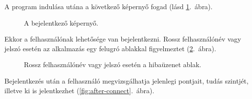 \documentclass[11pt, a4paper]{article}
\begin{document}
     A program indulása utána a következő képernyő fogad (lásd \ref{fig:connect}.~ábra).     
     \begin{figure}[h!]
	     \center
	     \caption{A bejelentkező képernyő.}
	     \label{fig:connect}
     \end{figure} 
     Ekkor a felhasználónak lehetősége van bejelentkezni. Rossz felhasználónév vagy jelszó esetén az alkalmazás egy felugró ablakkal figyelmeztet (\ref{fig:login-error}.~ábra).
     \begin{figure}[h!]
     	\center
     	\caption{Rossz felhasználónév vagy jelszó esetén a hibaüzenet ablak.}
     	\label{fig:login-error}
     \end{figure}
     Bejelentkezés után a felhasználó megvizsgálhatja jelenlegi pontjait, tudás szintjét, illetve ki is jelentkezhet (\ref{fig:after-connect}.~ábra).     
\end{document}
